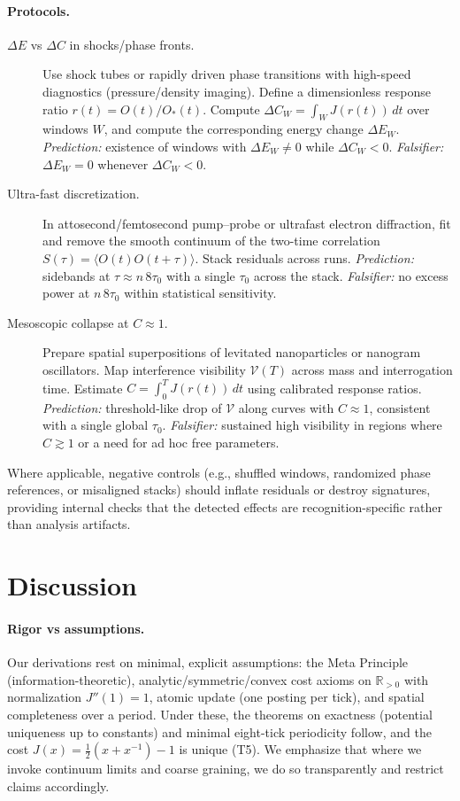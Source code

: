 \documentclass[aps,prx,twocolumn,superscriptaddress,nofootinbib]{revtex4-2}
\newcommand{\Jcost}{J}
\newcommand{\Ccost}{C}
\newcommand{\TauZero}{\tau_{0}}
\begin{document}
\paragraph*{Protocols.}
\begin{description}
  \item[\(\Delta E\) vs \(\Delta\Ccost\) in shocks/phase fronts.] Use shock tubes or rapidly driven phase transitions with high-speed diagnostics (pressure/density imaging). Define a dimensionless response ratio \(r(t)=O(t)/O_{\!*}(t)\). Compute \(\Delta\Ccost_W=\int_W\!\Jcost(r(t))\,dt\) over windows \(W\), and compute the corresponding energy change \(\Delta E_W\). \emph{Prediction:} existence of windows with \(\Delta E_W\neq 0\) while \(\Delta\Ccost_W<0\). \emph{Falsifier:} \(\Delta E_W=0\) whenever \(\Delta\Ccost_W<0\).
  \item[Ultra-fast discretization.] In attosecond/femtosecond pump--probe or ultrafast electron diffraction, fit and remove the smooth continuum of the two-time correlation \(S(\tau)=\langle O(t)O(t+\tau)\rangle\). Stack residuals across runs. \emph{Prediction:} sidebands at \(\tau\approx n\,8\TauZero\) with a single \(\TauZero\) across the stack. \emph{Falsifier:} no excess power at \(n\,8\TauZero\) within statistical sensitivity.
  \item[Mesoscopic collapse at \(\Ccost\approx 1\).] Prepare spatial superpositions of levitated nanoparticles or nanogram oscillators. Map interference visibility \(\mathcal{V}(T)\) across mass and interrogation time. Estimate \(\Ccost=\int_0^T\!\Jcost(r(t))\,dt\) using calibrated response ratios. \emph{Prediction:} threshold-like drop of \(\mathcal{V}\) along curves with \(\Ccost\approx 1\), consistent with a single global \(\TauZero\). \emph{Falsifier:} sustained high visibility in regions where \(\Ccost\gtrsim 1\) or a need for ad hoc free parameters.
\end{description}

Where applicable, negative controls (e.g., shuffled windows, randomized phase references, or misaligned stacks) should inflate residuals or destroy signatures, providing internal checks that the detected effects are recognition-specific rather than analysis artifacts.

\section{Discussion}\label{sec:discussion}
\paragraph*{Rigor vs assumptions.} Our derivations rest on minimal, explicit assumptions: the Meta Principle (information-theoretic), analytic/symmetric/convex cost axioms on \(\mathbb{R}_{>0}\) with normalization \(\Jcost''(1)=1\), atomic update (one posting per tick), and spatial completeness over a period. Under these, the theorems on exactness (potential uniqueness up to constants) and minimal eight-tick periodicity follow, and the cost \(\Jcost(x)=\tfrac12(x+x^{-1})-1\) is unique (T5). We emphasize that where we invoke continuum limits and coarse graining, we do so transparently and restrict claims accordingly.
\end{document}
